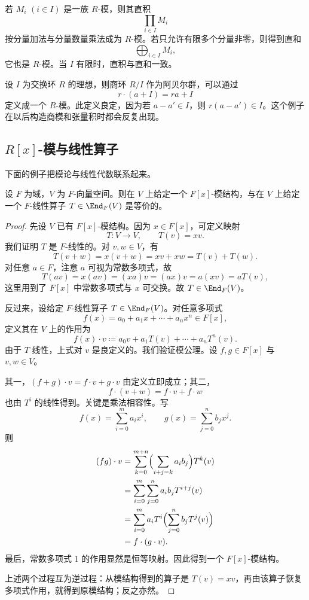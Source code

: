 \begin{example}[直积与直和]
若 $M_i$ $(i\in I)$ 是一族 $R$-模，则其直积
\[
\prod_{i\in I} M_i
\]
按分量加法与分量数量乘法成为 $R$-模。若只允许有限多个分量非零，则得到直和
\[
\bigoplus_{i\in I} M_i,
\]
它也是 $R$-模。当 $I$ 有限时，直积与直和一致。
\end{example}

\begin{example}[商环诱导的模]
设 $I$ 为交换环 $R$ 的理想，则商环 $R/I$ 作为阿贝尔群，可以通过
\[
r\cdot (a+I)=ra+I
\]
定义成一个 $R$-模。此定义良定，因为若 $a-a'\in I$，则 $r(a-a')\in I$。这个例子在以后构造商模和张量积时都会反复出现。
\end{example}

\subsection{$R[x]$-模与线性算子}

下面的例子把模论与线性代数联系起来。

\begin{proposition}
设 $F$ 为域，$V$ 为 $F$-向量空间。则在 $V$ 上给定一个 $F[x]$-模结构，与在 $V$ 上给定一个 $F$-线性算子 $T\in\End_F(V)$ 是等价的。
\end{proposition}

\begin{proof}
先设 $V$ 已有 $F[x]$-模结构。因为 $x\in F[x]$，可定义映射
\[
T\colon V\to V,\qquad T(v)=xv.
\]
我们证明 $T$ 是 $F$-线性的。对 $v,w\in V$，有
\[
T(v+w)=x(v+w)=xv+xw=T(v)+T(w).
\]
对任意 $a\in F$，注意 $a$ 可视为常数多项式，故
\[
T(av)=x(av)=(xa)v=(ax)v=a(xv)=aT(v),
\]
这里用到了 $F[x]$ 中常数多项式与 $x$ 可交换。故 $T\in \End_F(V)$。

反过来，设给定 $F$-线性算子 $T\in\End_F(V)$。对任意多项式
\[
f(x)=a_0+a_1x+\cdots+a_nx^n\in F[x],
\]
定义其在 $V$ 上的作用为
\[
f(x)\cdot v\coloneqq a_0v+a_1T(v)+\cdots+a_nT^n(v).
\]
由于 $T$ 线性，上式对 $v$ 是良定义的。我们验证模公理。设 $f,g\in F[x]$ 与 $v,w\in V$。

其一，$(f+g)\cdot v=f\cdot v+g\cdot v$ 由定义立即成立；其二，
\[
f\cdot (v+w)=f\cdot v+f\cdot w
\]
也由 $T^i$ 的线性得到。关键是乘法相容性。写
\[
f(x)=\sum_{i=0}^m a_ix^i,\qquad g(x)=\sum_{j=0}^n b_jx^j.
\]
则
\begin{align*}
(fg)\cdot v
&=\sum_{k=0}^{m+n}\Bigl(\sum_{i+j=k}a_ib_j\Bigr)T^k(v)\\
&=\sum_{i=0}^m\sum_{j=0}^n a_ib_jT^{i+j}(v)\\
&=\sum_{i=0}^m a_iT^i\Bigl(\sum_{j=0}^n b_jT^j(v)\Bigr)\\
&=f\cdot (g\cdot v).
\end{align*}
最后，常数多项式 $1$ 的作用显然是恒等映射。因此得到一个 $F[x]$-模结构。

上述两个过程互为逆过程：从模结构得到的算子是 $T(v)=xv$，再由该算子恢复多项式作用，就得到原模结构；反之亦然。
\end{proof}

